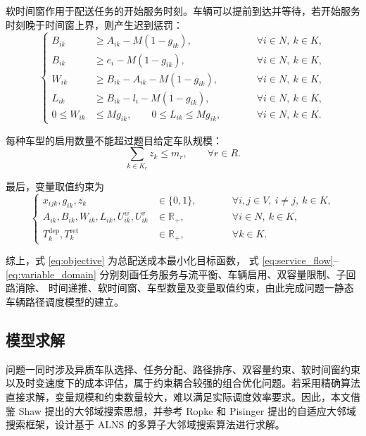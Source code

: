 \documentclass[withoutpreface,bwprint]{cumcmthesis} %
\begin{document}
软时间窗作用于配送任务的开始服务时刻。车辆可以提前到达并等待，若开始服务时刻晚于时间窗上界，则产生迟到惩罚：
\begin{equation}
\left\{
\begin{alignedat}{2}
B_{ik} &\geq A_{ik}-M(1-g_{ik}),
&\qquad& \forall i\in N,\ k\in K,\\
B_{ik} &\geq e_i-M(1-g_{ik}),
&& \forall i\in N,\ k\in K,\\
W_{ik} &\geq B_{ik}-A_{ik}-M(1-g_{ik}),
&& \forall i\in N,\ k\in K,\\
L_{ik} &\geq B_{ik}-l_i-M(1-g_{ik}),
&& \forall i\in N,\ k\in K,\\
0\leq W_{ik} &\leq Mg_{ik},\qquad
0\leq L_{ik}\leq Mg_{ik},
&& \forall i\in N,\ k\in K.
\end{alignedat}
\right.
\label{eq:soft_time_window}
\end{equation}

每种车型的启用数量不能超过题目给定车队规模：
\begin{equation}
\sum_{k\in K_r}z_k\leq m_r,\qquad \forall r\in R.
\label{eq:fleet_size}
\end{equation}

最后，变量取值约束为
\begin{equation}
\left\{
\begin{alignedat}{2}
x_{ijk},g_{ik},z_k &\in \{0,1\},
&\qquad& \forall i,j\in V,\ i\ne j,\ k\in K,\\
A_{ik},B_{ik},W_{ik},L_{ik},U_{ik}^w,U_{ik}^v
&\in \mathbb{R}_{+},
&& \forall i\in N,\ k\in K,\\
T_k^{\mathrm{dep}},T_k^{\mathrm{ret}}
&\in \mathbb{R}_{+},
&& \forall k\in K.
\end{alignedat}
\right.
\label{eq:variable_domain}
\end{equation}

综上，式 \eqref{eq:objective} 为总配送成本最小化目标函数，
式 \eqref{eq:service_flow}--\eqref{eq:variable_domain}
分别刻画任务服务与流平衡、车辆启用、双容量限制、子回路消除、
时间递推、软时间窗、车型数量及变量取值约束，由此完成问题一静态车辆路径调度模型的建立。

\subsection{模型求解}

问题一同时涉及异质车队选择、任务分配、路径排序、双容量约束、软时间窗约束以及时变速度下的成本评估，属于约束耦合较强的组合优化问题。若采用精确算法直接求解，变量规模和约束数量较大，难以满足实际调度效率要求。因此，本文借鉴 Shaw 提出的大邻域搜索思想\cite{shaw1998}，并参考 Ropke 和 Pisinger 提出的自适应大邻域搜索框架\cite{ropke2006}，设计基于 ALNS 的多算子大邻域搜索算法进行求解。
\end{document}
